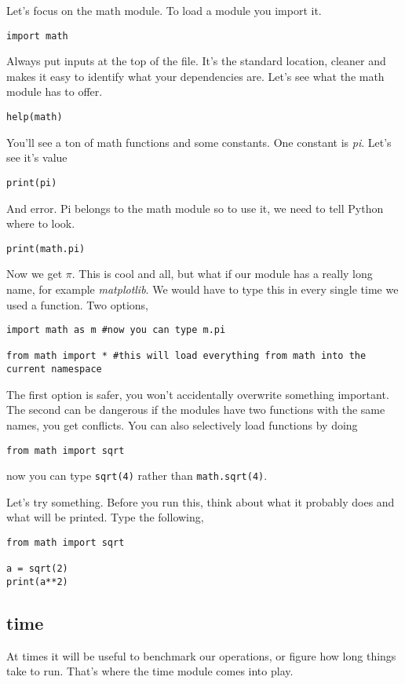 \documentclass[11pt,letterpaper]{article}
\begin{document}
Let's focus on the math module. To load a module you import it.
\begin{verbatim}
import math
\end{verbatim}
Always put inputs at the top of the file. It's the standard location, cleaner and makes it easy to 
identify what your dependencies are. Let's see what the math module has to offer.
\begin{verbatim}
help(math)
\end{verbatim}
You'll see a ton of math functions and some constants. One constant is \emph{pi}. Let's see it's value
\begin{verbatim}
print(pi)
\end{verbatim}
And error. Pi belongs to the math module so to use it, we need to tell Python where to look.
\begin{verbatim}
print(math.pi)
\end{verbatim}
Now we get $\pi$. This is cool and all, but what if our module has a really long name, for example \emph{matplotlib}. We would have to type this in every single time we used a function. Two options,
\begin{verbatim}
import math as m #now you can type m.pi

from math import * #this will load everything from math into the current namespace
\end{verbatim}
The first option is safer, you won't accidentally overwrite something important. The second can be dangerous if the modules have two functions with the same names, you get conflicts. You can also selectively load functions by doing
\begin{verbatim}
from math import sqrt
\end{verbatim}
now you can type \texttt{sqrt(4)} rather than \texttt{math.sqrt(4)}.



Let's try something. Before you run this, think about what it probably does and what will be printed.
Type the following,
\begin{verbatim}
from math import sqrt

a = sqrt(2)
print(a**2)
\end{verbatim}


\subsection{time}
At times it will be useful to benchmark our operations, or figure how long things take to run.
That's where the time module comes into play.
\end{document}
